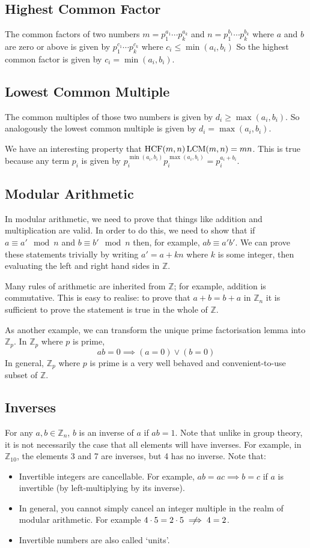 \subsection{Highest Common Factor}
The common factors of two numbers $m = p_1^{a_1} \cdots p_k^{a_k}$ and $n = p_1^{b_1} \cdots p_k^{b_k}$ where $a$ and $b$ are zero or above is given by $p_1^{c_1} \cdots p_k^{c_k}$ where $c_i \leq \min(a_i, b_i)$ So the highest common factor is given by $c_i = \min(a_i, b_i)$.

\subsection{Lowest Common Multiple}
The common multiples of those two numbers is given by $d_i \geq \max(a_i, b_i)$. So analogously the lowest common multiple is given by $d_i = \max(a_i, b_i)$.

We have an interesting property that $\operatorname{HCF}(m, n) \operatorname{LCM}(m, n) = mn$. This is true because any term $p_i$ is given by $p_i^{\min(a_i, b_i)}p_i^{\max(a_i, b_i)} = p_i^{a_i + b_i}$.

\subsection{Modular Arithmetic}
In modular arithmetic, we need to prove that things like addition and multiplication are valid. In order to do this, we need to show that if $a \equiv a' \mod n$ and $b \equiv b' \mod n$ then, for example, $ab \equiv a'b'$. We can prove these statements trivially by writing $a' = a + kn$ where $k$ is some integer, then evaluating the left and right hand sides in $\mathbb Z$.

Many rules of arithmetic are inherited from $\mathbb Z$; for example, addition is commutative. This is easy to realise: to prove that $a + b = b + a$ in $\mathbb Z_n$ it is sufficient to prove the statement is true in the whole of $\mathbb Z$.

As another example, we can transform the unique prime factorisation lemma into $\mathbb Z_p$. In $\mathbb Z_p$ where $p$ is prime,
\[ ab = 0 \implies (a = 0) \lor (b = 0) \]
In general, $\mathbb Z_p$ where $p$ is prime is a very well behaved and convenient-to-use subset of $\mathbb Z$.

\subsection{Inverses}
For any $a, b \in \mathbb Z_n$, $b$ is an inverse of $a$ if $ab=1$. Note that unlike in group theory, it is not necessarily the case that all elements will have inverses. For example, in $\mathbb Z_{10}$, the elements 3 and 7 are inverses, but 4 has no inverse. Note that:
\begin{itemize}
	\item Invertible integers are cancellable. For example, $ab=ac \implies b=c$ if $a$ is invertible (by left-multiplying by its inverse).
	\item In general, you cannot simply cancel an integer multiple in the realm of modular arithmetic. For example $4 \cdot 5 = 2 \cdot 5 \centernot\implies 4 = 2$.
	\item Invertible numbers are also called `units'.
\end{itemize}
